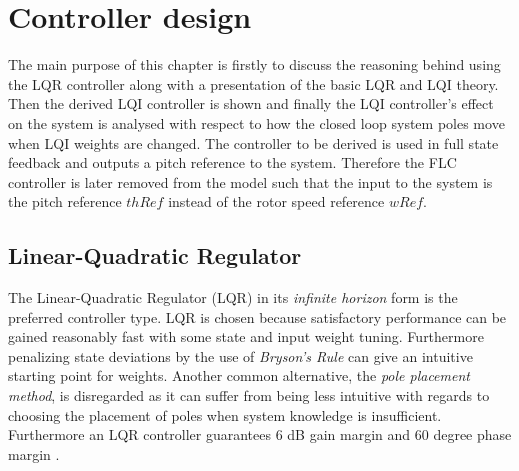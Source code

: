 \section{Controller design} \label{sec:ctrl-design}
The main purpose of this chapter is firstly to discuss the reasoning behind using the LQR controller along with a presentation of the basic LQR and LQI theory. Then the derived LQI controller is shown and finally the LQI controller's effect on the system is analysed with respect to how the closed loop system poles move when LQI weights are changed. The controller to be derived is used in full state feedback and outputs a pitch reference to the system. Therefore the FLC controller is later removed from the model such that the input to the system is the pitch reference $ thRef $ instead of the rotor speed reference $ wRef $.

\subsection{Linear-Quadratic Regulator} \label{sec:ctrl_lqr}
The Linear-Quadratic Regulator (LQR) in its \textit{infinite horizon} form is the preferred controller type. LQR is chosen because satisfactory performance can be gained reasonably fast with some state and input weight tuning. Furthermore penalizing state deviations by the use of \textit{Bryson's Rule} can give an intuitive starting point for weights. Another common alternative, the \textit{pole placement method}, is disregarded as it can suffer from being less intuitive with regards to choosing the placement of poles when system knowledge is insufficient. Furthermore an LQR controller guarantees 6 dB gain margin and 60 degree phase margin \cite{Doyle1978}. 

